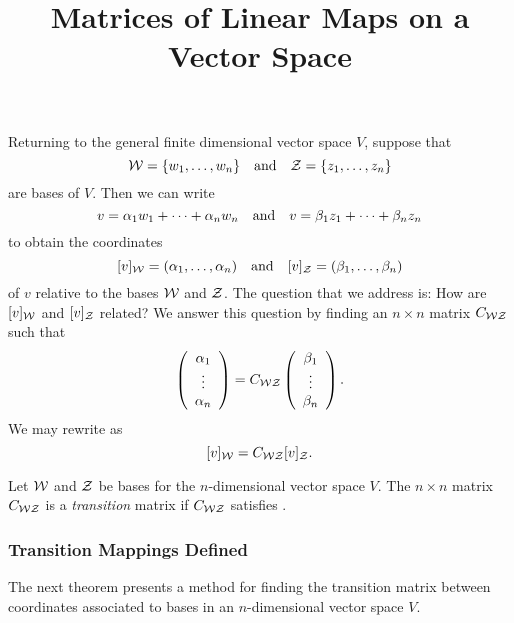 \documentclass{ximera}
\title{Matrices of Linear Maps on a Vector Space}
\begin{document}
\begin{abstract}
\end{abstract}
\maketitle

  \label{MALT}
  


Returning to the general finite dimensional vector space $V$, suppose that
\[
{\cal W} = \{w_1,\ldots,w_n\} \quad\mbox{and}\quad {\cal Z} = \{z_1,\ldots,z_n\}
\]
are bases of $V$.  Then we can write
\[
v = \alpha_1 w_1 + \cdots + \alpha_n w_n \quad\mbox{and}\quad
v = \beta_1 z_1 + \cdots + \beta_n z_n
\]
to obtain the coordinates
\begin{equation}  \label{e:vincoords}
[v]_{\cal W} = (\alpha_1,\ldots,\alpha_n) \quad\mbox{and}\quad
[v]_{\cal Z} = (\beta_1,\ldots,\beta_n)
\end{equation}
of $v$ relative to the bases ${\cal W}$ and ${\cal Z}$.  The question that
we address is: How are $[v]_{\cal W}$ and $[v]_{\cal Z}$ related?  We answer
this question by finding an $n\times n$ matrix $C_{{\cal W}{\cal Z}}$ such that
\begin{equation} \label{e:coordchange}
\left(\begin{array}{c} \alpha_1 \\ \vdots \\ \alpha_{n}\end{array}\right) = C_{{\cal W}{\cal Z}} \left(\begin{array}{c} \beta_1 \\ \vdots \\ \beta_{n}\end{array}\right).
\end{equation}
We may rewrite  as
\begin{equation}  \label{e:coordchange2}
[v]_{\cal W} = C_{{\cal W}{\cal Z}}[v]_{\cal Z}.
\end{equation}

\begin{Def}
Let ${\cal W}$ and ${\cal Z}$ be bases for the $n$-dimensional
vector space $V$.  The $n\times n$ matrix $C_{{\cal W}{\cal Z}}$
is a {\em transition\/} matrix if $C_{{\cal W}{\cal Z}}$ satisfies
.
\end{Def}  


\subsubsection*{Transition Mappings Defined}

The next theorem presents a method for finding the transition matrix
between coordinates associated to bases in an $n$-dimensional vector
space $V$.
\end{document}

